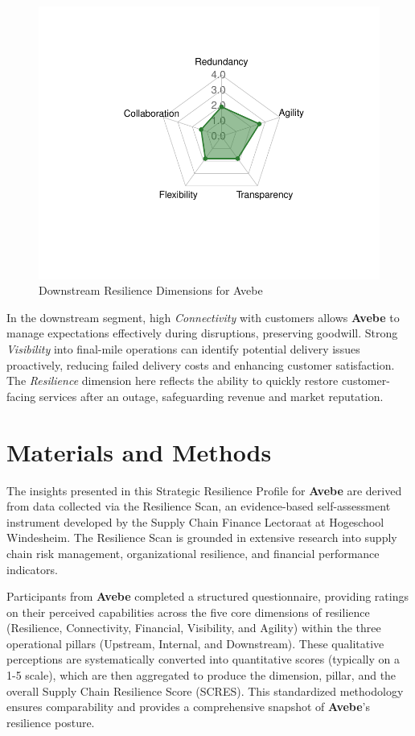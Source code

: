 \documentclass[
  oneside,
  open=any,
  fontsize=11pt]{scrbook}
\begin{document}
\begin{figure}[H]

{\centering \includegraphics[width=0.8\linewidth,height=\textheight,keepaspectratio]{example_3_files/figure-pdf/downstream-radar-chart-1.pdf}

}

\caption{Downstream Resilience Dimensions for Avebe}

\end{figure}%

In the downstream segment, high \emph{Connectivity} with customers
allows \textbf{Avebe} to manage expectations effectively during
disruptions, preserving goodwill. Strong \emph{Visibility} into
final-mile operations can identify potential delivery issues
proactively, reducing failed delivery costs and enhancing customer
satisfaction. The \emph{Resilience} dimension here reflects the ability
to quickly restore customer-facing services after an outage,
safeguarding revenue and market reputation.

\chapter{Materials and Methods}\label{materials-and-methods}

The insights presented in this Strategic Resilience Profile for
\textbf{Avebe} are derived from data collected via the Resilience Scan,
an evidence-based self-assessment instrument developed by the Supply
Chain Finance Lectoraat at Hogeschool Windesheim. The Resilience Scan is
grounded in extensive research into supply chain risk management,
organizational resilience, and financial performance indicators.

Participants from \textbf{Avebe} completed a structured questionnaire,
providing ratings on their perceived capabilities across the five core
dimensions of resilience (Resilience, Connectivity, Financial,
Visibility, and Agility) within the three operational pillars (Upstream,
Internal, and Downstream). These qualitative perceptions are
systematically converted into quantitative scores (typically on a 1-5
scale), which are then aggregated to produce the dimension, pillar, and
the overall Supply Chain Resilience Score (SCRES). This standardized
methodology ensures comparability and provides a comprehensive snapshot
of \textbf{Avebe}'s resilience posture.
\end{document}
